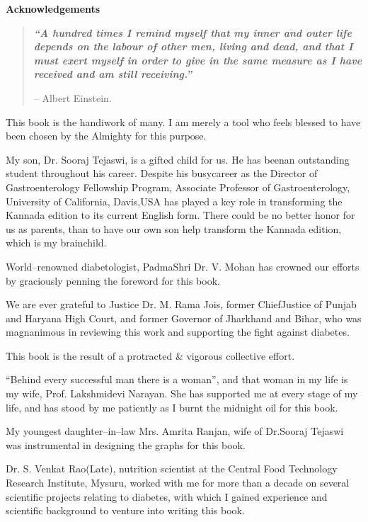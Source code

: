 \thispagestyle{empty}

\begin{center}
\Huge\textbf{Acknowledgements}
\end{center}

\vskip 20pt

\begin{quote}
\textbf{\textit{“A hundred times I remind myself that my inner and outer life depends on the labour of other men, living and dead, and that I must exert myself in order to give in the same measure as I have received and am still receiving.”}}
\begin{flushright}
– Albert Einstein.
\end{flushright}
\end{quote}

This book is the handiwork of many. I am merely a tool who feels blessed to have been chosen by the Almighty for this purpose.

My son, Dr. Sooraj Tejaswi, is a gifted child for us. He has been\break an outstanding student throughout his career. Despite his busy\break career as the Director of Gastroenterology Fellowship Program, Asso\-ciate Professor of Gastroenterology, University of California, Davis,\break USA has played a key role in transforming the Kannada edition to its current English form. There could be no better honor for us as parents, than to have our own son help transform the Kannada edition, which is my brainchild.

World–renowned diabetologist, PadmaShri Dr. V. Mohan has crow\-ned our efforts by graciously penning the foreword for this book.

We are ever grateful to Justice Dr. M. Rama Jois, former Chief\break Justice of Punjab and Haryana High Court, and former Governor of Jharkhand and Bihar, who was magnanimous in reviewing this work and supporting the fight against diabetes.

This book is the result of a protracted \& vigorous collective effort.

“Behind every successful man there is a woman”, and that woman in my life is my wife, Prof. Lakshmidevi Narayan. She has supported me at every stage of my life, and has stood by me patiently as I burnt the midnight oil for this book.

My youngest daughter–in–law Mrs. Amrita Ranjan, wife of Dr.Sooraj Tejaswi was instrumental in designing the graphs for this book.

Dr. S. Venkat Rao(Late), nutrition scientist at the Central Food Technology Research Institute, Mysuru, worked with me for more than a decade on several scientific projects relating to diabetes, with which I gained experience and scientific background to venture into writing this book.

